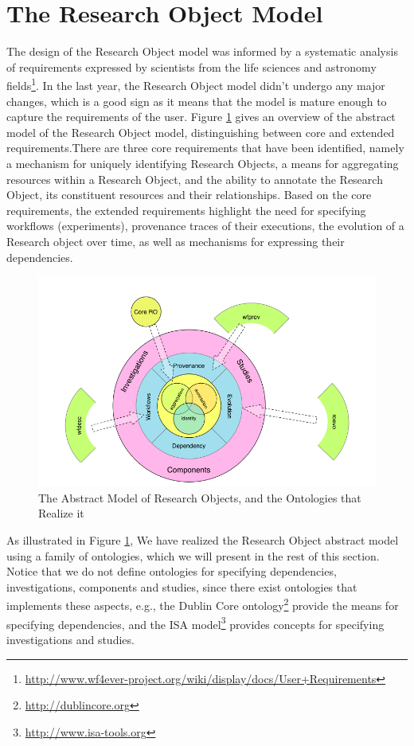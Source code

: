 \section{The Research Object Model}
\label{sec:romodel}

The design of the Research Object model was informed by a systematic analysis of requirements expressed by scientists from the life sciences and astronomy fields\footnote{\url{http://www.wf4ever-project.org/wiki/display/docs/User+Requirements}}. In the last year, the Research Object model didn't undergo any major changes, which is a good sign as it means that the model is mature enough to capture the requirements of the user. Figure \ref{fig:wm_abstract} gives an overview of the abstract model of the Research Object model, distinguishing between core and extended requirements.There are three core requirements that have been identified, namely a mechanism for uniquely identifying Research Objects, a means for aggregating resources within a Research Object, and the ability to annotate the Research Object, its constituent resources and their relationships. Based on the core requirements, the extended requirements highlight the need for specifying workflows (experiments), provenance traces of their executions, the evolution of a Research object over time, as well as mechanisms for expressing their dependencies. 


\begin{figure}[ht]
  \centering
  \includegraphics[width=.8\textwidth]{Figures/ro-model.png}
  \caption{The Abstract Model of Research Objects, and the Ontologies that Realize it}
  \label{fig:wm_abstract}
\end{figure}

As illustrated in Figure \ref{fig:wm_abstract}, We have realized the Research Object abstract model using  a family of ontologies, which we will present in the rest of this section. Notice that we do not define ontologies for specifying dependencies, investigations, components and studies, since there exist ontologies that implements these aspects, e.g., the Dublin Core ontology\footnote{\url{http://dublincore.org}} provide the means for specifying dependencies, and the ISA model\footnote{\url{http://www.isa-tools.org}} provides concepts for specifying investigations and studies.


